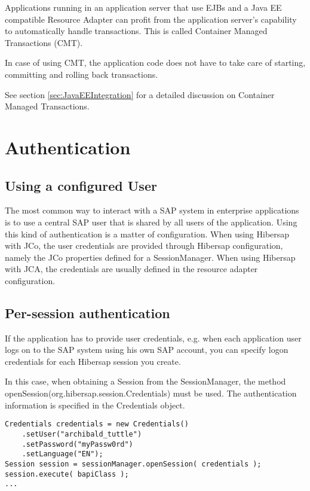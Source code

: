 Applications running in an application server that use EJBs and a Java EE compatible Resource Adapter can profit from the
application server's capability to automatically handle transactions. This is called Container Managed Transactions (CMT).

In case of using CMT, the application code does not have to take care of starting, committing and rolling back transactions.

See section \ref{sec:JavaEEIntegration} for a detailed discussion on Container Managed Transactions.

\section{Authentication}

\subsection{Using a configured User}

The most common way to interact with a SAP system in enterprise applications is to use a central SAP user that is shared by all users of the application. Using this kind of authentication is a matter of configuration. When using Hibersap with JCo, the user credentials are provided through Hibersap configuration, namely the JCo properties defined for a SessionManager. When using Hibersap with JCA, the credentials are usually defined in the resource adapter configuration.

\subsection{Per-session authentication}
\label{sec:PerSessionAuthentication}

If the application has to provide user credentials, e.g. when each application user logs on to the SAP system using his own SAP account, you can specify logon credentials for each Hibersap session you create.

In this case, when obtaining a Session from the SessionManager, the method \\openSession(org.hibersap.session.Credentials) must be used. The authentication information is specified in the Credentials object.

\begin{lstlisting}[caption=Component managed authentication]
Credentials credentials = new Credentials()
    .setUser("archibald_tuttle")
    .setPassword("myPassw0rd")
    .setLanguage("EN");
Session session = sessionManager.openSession( credentials );
session.execute( bapiClass );
...
\end{lstlisting}

